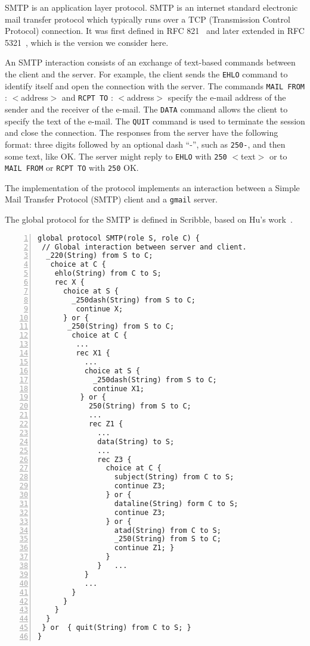 
SMTP is an application layer protocol.
{SMTP} is an internet standard
electronic mail transfer protocol which typically runs over a TCP
(Transmission Control Protocol) connection.
It was first defined in RFC
821~\cite{SMTP-rfc} and later extended in RFC 5321~\cite{ESMTP-rfc},
which is the version we consider here.


An SMTP interaction consists of an exchange of text-based {commands}
between the client and the server.
For example, the client sends the
\lstinline|EHLO| command to identify itself and open the connection with
the server.
%
The commands \lstinline|MAIL FROM| : $<$address$>$ and \lstinline|RCPT TO| : $<$address$>$
specify the e-mail address of the sender and the
receiver of the e-mail.
%
The \lstinline|DATA| command allows the client to specify the text of
the e-mail. The \lstinline|QUIT| command is used to terminate the
session and close the connection. The responses from the server have the
following format: three digits followed by an optional dash ``-'', such
as \lstinline|250-|, and then some text, like OK. The server might reply
to \lstinline|EHLO| with \lstinline|250| $<$text$>$ or to
\lstinline|MAIL FROM| or \lstinline|RCPT TO| with \lstinline|250| OK.


The implementation of the protocol implements an interaction between
a Simple Mail Transfer Protocol (SMTP) client and a \lstinline|gmail| server.


The global protocol for the SMTP is defined in Scribble, 
based on Hu's work~\cite{HuR:smtp}.

\begin{lstlisting}[numbers=left]
global protocol SMTP(role S, role C) {
 // Global interaction between server and client.
  _220(String) from S to C;
   choice at C {
    ehlo(String) from C to S;
    rec X {
      choice at S {
        _250dash(String) from S to C;
         continue X;
      } or {
       _250(String) from S to C;
        choice at C {
         ...
         rec X1 {
           ...
           choice at S {
             _250dash(String) from S to C;
             continue X1;
          } or {
            250(String) from S to C;
            ...
            rec Z1 {
              ...
              data(String) to S;
              ...
              rec Z3 {
                choice at C {
                  subject(String) from C to S;
                  continue Z3;
                } or {
                  dataline(String) form C to S;
                  continue Z3;
                } or {
                  atad(String) from C to S;
                  _250(String) from S to C;
                  continue Z1; }
                }
              }   ...  
           }  
           ... 
        }
      }
    }
  }
 } or  { quit(String) from C to S; }
}
\end{lstlisting}


